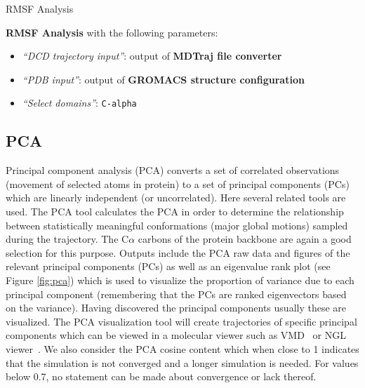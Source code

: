 \documentclass[twocolumn]{bmcart}%
\providecommand{\tightlist}{%
  \setlength{\itemsep}{0pt}\setlength{\parskip}{0pt}}
\begin{document}
\begin{handson_box_colour}{RMSF Analysis}



  \textbf{RMSF Analysis} with the following parameters:

  \begin{itemize}
  \tightlist
  \item
    \emph{``DCD trajectory input''}: output of
    \textbf{MDTraj file converter}
  \item
    \emph{``PDB input''}:
    output of \textbf{GROMACS
    structure configuration}
  \item
    \emph{``Select domains''}: \texttt{C-alpha}
  \end{itemize}



\end{handson_box_colour}


\hypertarget{pca-analysis}{%
\subsection*{PCA}\label{pca-analysis}}

Principal component analysis (PCA) converts a set of correlated
observations (movement of selected atoms in protein) to a set of principal
components (PCs) which are linearly independent (or uncorrelated). Here several related tools are used. 
The PCA tool calculates the PCA in order to determine the relationship between statistically meaningful conformations (major global motions) sampled during the trajectory. The C$\alpha$ carbons of the protein backbone are again a good selection for this purpose.  Outputs include the PCA raw data and figures of the relevant principal components (PCs) as well as an eigenvalue rank plot (see Figure \ref{fig:pca}) which is used to visualize the proportion of variance due to each principal component (remembering that the PCs are ranked eigenvectors based on the variance). 
Having discovered the principal components usually these are visualized. The PCA visualization tool will create trajectories of specific principal components which can be viewed in a molecular viewer such as VMD~\cite{hump_vmd_1996} or NGL viewer~\cite{Rose2018ngl}. We also consider the PCA cosine content which when close to 1 indicates that the simulation is not converged and a longer simulation is needed. For values below 0.7, no statement can be made about convergence or lack thereof. 
\end{document}
